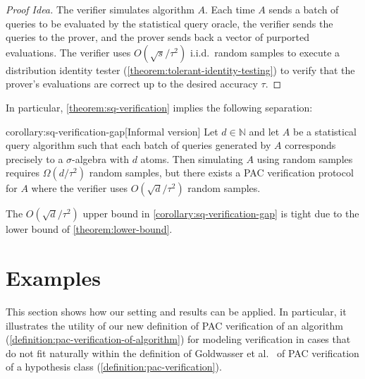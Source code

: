 \documentclass[11pt]{article}
\numberwithin{equation}{section}
\theoremstyle{definition}
\theoremstyle{plain}
\theoremstyle{definition}\newtheorem{notation}[theorem]{Notation}\theoremstyle{plain}\raggedbottom
\newcommand{\roundBrackets}[1]{
	\mathopen{}\left(#1\right)\mathclose{}
}
\newcommand{\OmegaOf}[1]{\Omega\roundBrackets{#1}}
\newcommand{\BigO}[1]{O\roundBrackets{#1}}
\newcommand{\bbN}{\mathbb{N}}
\newcommand{\1}{\mathds{1}}
\begin{document}
\begin{proof}[Proof Idea]
	The verifier simulates algorithm $A$. Each time $A$ sends a batch of queries to be evaluated by the statistical query oracle, the verifier sends the queries to the prover, and the prover sends back a vector of purported evaluations. The verifier uses $\BigO{\sqrt{s}/\tau^2}$ i.i.d.\ random samples to execute a distribution identity tester (\cref{theorem:tolerant-identity-testing}) to verify that the prover's evaluations are correct up to the desired accuracy $\tau$.
\end{proof}

In particular, \cref{theorem:sq-verification} implies the following separation:

\begin{repcorollary}{corollary:sq-verification-gap}[Informal version]
	Let $d \in \bbN$ and let $A$ be a statistical query algorithm such that each batch of queries generated by $A$ corresponds precisely to a $\sigma$-algebra with $d$ atoms. Then simulating $A$ using random samples requires $\OmegaOf{d/\tau^2}$ random samples, but there exists a PAC verification protocol for $A$ where the verifier uses $\BigO{\sqrt{d}/\tau^2}$ random samples.
\end{repcorollary}

The $\BigO{\sqrt{d}/\tau^2}$ upper bound in \cref{corollary:sq-verification-gap} is tight due to the lower bound of \cref{theorem:lower-bound}.


\section{Examples}

This section shows how our setting and results can be applied. In particular, it illustrates the utility of our new definition of PAC verification of an algorithm (\cref{definition:pac-verification-of-algorithm}) for modeling verification in cases that do not fit naturally within the definition of Goldwasser et al.\ \cite{GoldwasserRSY21} of PAC verification of a hypothesis class (\cref{definition:pac-verification}).
\end{document}
